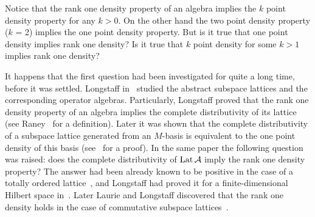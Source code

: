 \documentclass[12pt,oneside,a4paper]{amsart}
\begin{document}
  Notice that the rank one density property of an algebra implies the $k$ point density property for any $k > 0$.
  On the other hand the two point density property ($k$ = 2) implies the one point density property.
  But is it true that one point density implies rank one density?
  Is it true that $k$ point density for some $k > 1$ implies rank one density?

  It happens that the first question had been investigated for quite a long time, before it was settled.
  Long\-staff in~\cite{longstaff} studied the abstract subspace lattices and the corresponding operator algebras.
  Particularly, Longstaff proved that the rank one density property of an algebra implies
    the complete distributivity of its lattice (see Raney~\cite{raney} for a definition).
  Later it was shown that the complete distributivity of a subspace lattice generated from an $M$-basis
    is equivalent to the one point density of this basis (see~\cite{argyroslambrou} for a proof).
  In the same paper the following question was raised: does the complete distributivity of $\operatorname{Lat}\mathcal{A}$ imply the rank one density property?
  The answer had been already known to be positive in the case of a totally ordered lattice~\cite{erdos}, and
    Longstaff had proved it for a finite-dimensional Hilbert space in~\cite{longstaff}.
  Later Laurie and Longstaff discovered that the rank one density holds in the case of commutative subspace lattices~\cite{laurielongstaff}.
\end{document}
